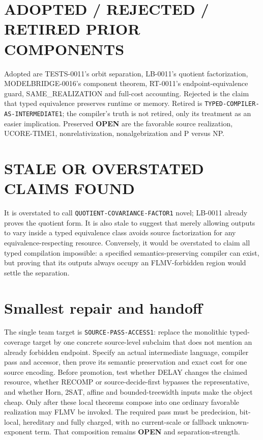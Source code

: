 \documentclass[11pt]{article}
\newcommand{\OPEN}{\textbf{OPEN}}
\begin{document}
\section{ADOPTED / REJECTED / RETIRED PRIOR COMPONENTS}
Adopted are TESTS-0011's orbit separation, LB-0011's quotient factorization,
MODELBRIDGE-0016's component theorem, RT-0011's endpoint-equivalence guard,
SAME\_REALIZATION and full-cost accounting.  Rejected is the claim that
typed equivalence preserves runtime or memory.  Retired is
\texttt{TYPED-COMPILER-AS-INTERMEDIATE1}; the compiler's truth is not
retired, only its treatment as an easier implication.  Preserved \OPEN{} are
the favorable source realization, UCORE-TIME1, nonrelativization,
nonalgebrization and P versus NP.

\section{STALE OR OVERSTATED CLAIMS FOUND}
It is overstated to call \texttt{QUOTIENT-COVARIANCE-FACTOR1} novel; LB-0011
already proves the quotient form.  It is also stale to suggest that merely
allowing outputs to vary inside a typed equivalence class avoids source
factorization for any equivalence-respecting resource.  Conversely, it would
be overstated to claim all typed compilation impossible: a specified
semantics-preserving compiler can exist, but proving that its outputs always
occupy an FLMV-forbidden region would settle the separation.

\section{Smallest repair and handoff}
The single team target is \texttt{SOURCE-PASS-ACCESS1}: replace the
monolithic typed-coverage target by one concrete source-level
subclaim that does not mention an already forbidden endpoint.  Specify an
actual intermediate language, compiler pass and accessor, then prove its
semantic preservation and exact cost for one source encoding.  Before
promotion, test whether DELAY changes the claimed resource, whether RECOMP or
source-decide-first bypasses the representative, and whether Horn, 2SAT,
affine and bounded-treewidth inputs make the object cheap.  Only after these
local theorems compose into one ordinary favorable realization may FLMV be
invoked.  The required pass must be predecision, bit-local, hereditary and
fully charged, with no current-scale or fallback unknown-exponent term.  That
composition remains \OPEN{} and separation-strength.
\end{document}
